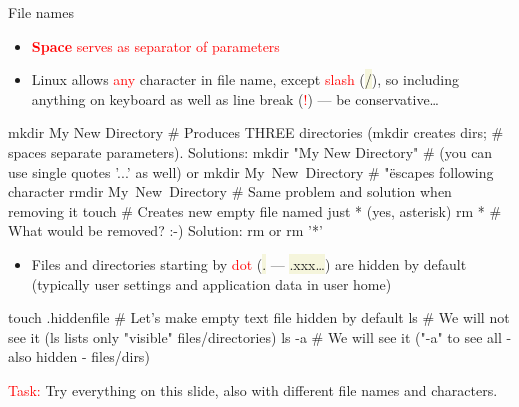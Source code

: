 \documentclass[compress, xelatex, 11pt, xcolor=svgnames, aspectratio=169,
	hyperref={
		bookmarks=true,
		unicode=true,
		colorlinks=true,
		pdftitle={Linux, command line and MetaCentrum},
		plainpages=false,
		pdfauthor={Vojtech Zeisek},
		pdfsubject={Course about use of Linux command line, writing shell scripts and using MetaCentrum of CESNET},
		pdfcreator={XeLaTeX},
		pdfkeywords={Linux, GNU, BASH, shell, command line, MetaCentrum},
		linkcolor=DarkRed, %
		anchorcolor=DarkBlue, %
		citecolor=Indigo, %
		filecolor=NavyBlue, %
		menucolor=DarkMagenta, %
		urlcolor=DarkBlue, %
		},
	url={hyphens, lowtilde} %
	]{beamer}
\renewcommand{\texttt}[1]{\colorbox{Beige}{{\ttfamily #1}}}
\renewcommand{\alert}[1]{\textcolor{red}{#1}}
\begin{document}
\begin{frame}[fragile]{File names}
	\label{filenames}
	\begin{itemize}
		\item \alert{\textbf{Space} serves as separator of parameters}
		\item Linux allows \alert{any} character in file name, except \alert{slash} (\texttt{/}), so including anything on keyboard as well as line break (\alert{!}) --- be conservative\ldots
	\end{itemize}
	\begin{bashcode}
    mkdir My New Directory # Produces THREE directories (mkdir creates dirs;
                           # spaces separate parameters). Solutions:
    mkdir "My New Directory" # (you can use single quotes '...' as well) or
    mkdir My\ New\ Directory # "\" escapes following character
    rmdir My\ New\ Directory # Same problem and solution when removing it
    touch \* # Creates new empty file named just * (yes, asterisk)
    rm * # What would be removed? :-) Solution: rm \* or rm '*'
	\end{bashcode}
	\begin{itemize}
		\item Files and directories starting by \alert{dot} (\texttt{.} --- \texttt{.xxx\ldots}) are hidden by default (typically user settings and application data in user home)
	\end{itemize}
	\begin{bashcode}
    touch .hiddenfile # Let's make empty text file hidden by default
    ls # We will not see it (ls lists only "visible" files/directories)
    ls -a # We will see it ("-a" to see all - also hidden - files/dirs)
	\end{bashcode}
	\alert{Task:} Try everything on this slide, also with different file names and characters.
\end{frame}
\end{document}
